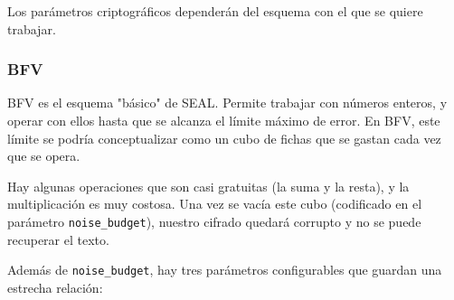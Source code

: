 Los parámetros criptográficos dependerán del esquema con el que se quiere trabajar.

\subsubsection{BFV}

BFV es el esquema "básico" de SEAL. Permite trabajar con números enteros, y operar con ellos hasta que se alcanza el límite máximo de error. En BFV, este límite se podría conceptualizar como un cubo de fichas que se gastan cada vez que se opera.

Hay algunas operaciones que son casi gratuitas (la suma y la resta), y la multiplicación es muy costosa. Una vez se vacía este cubo (codificado en el parámetro \verb|noise_budget|), nuestro cifrado quedará corrupto y no se puede recuperar el texto.

Además de \verb|noise_budget|, hay tres parámetros configurables que guardan una estrecha relación:

